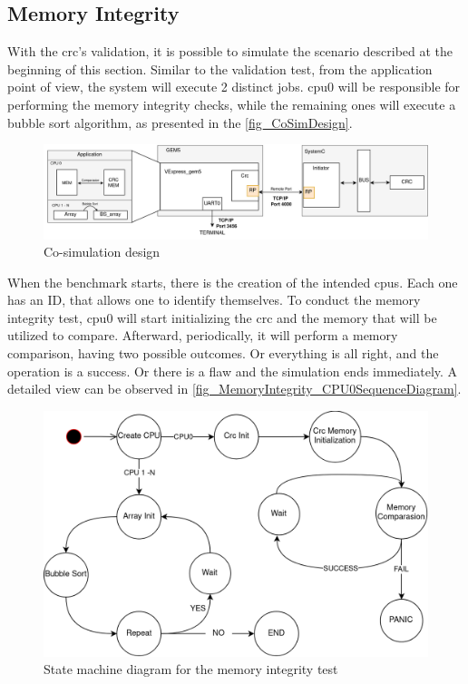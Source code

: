 \subsection{Memory Integrity}

With the \gls{crc}'s validation, it is possible to simulate the scenario described at the beginning of this section. 
Similar to the validation test, 
from the application point of view, the system will execute 2 distinct jobs. \gls{cpu}0 will be responsible for 
performing the memory integrity checks, while the remaining ones will execute a bubble sort algorithm, as presented in 
the \autoref{fig_CoSimDesign}.

\begin{figure}[H]
	\centering
 	\includegraphics[width=1\linewidth]{Images/CoSimDesign.png}
 	\caption{Co-simulation design}
	 \label{fig_CoSimDesign}
\end{figure}

When the benchmark starts, there is the creation of the intended \glspl{cpu}. Each one has an ID, that allows one to identify
themselves. To conduct the memory integrity test, \gls{cpu}0 will start initializing the \gls{crc} and the memory that will 
be utilized to compare. Afterward, periodically, it will perform a memory comparison, having two possible outcomes. Or everything
is all right, and the operation is a success. Or there is a flaw and the simulation ends immediately. A detailed view can be 
observed in \ref{fig_MemoryIntegrity_CPU0SequenceDiagram}. 

\begin{figure}[H]
	\centering
 	\includegraphics[width=0.7\linewidth]{Images/MemoryIntegrity_StateDiagram.png}
 	\caption{State machine diagram for the memory integrity test}
	\label{fig_MemoryIntegrity_StateDiagram}
\end{figure}


